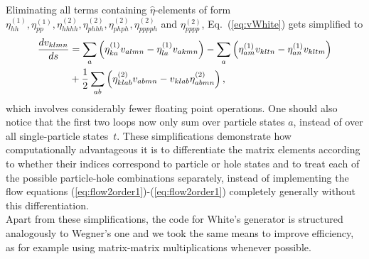 Eliminating all terms containing $\hat{\eta}$-elements of form $\eta_{hh}^{(1)}, \eta_{pp}^{(1)}, \eta_{hhhh}^{(2)}, \eta_{phhh}^{(2)}, \eta_{phph}^{(2)}, \eta_{pppph}^{(2)}$ and $\eta_{pppp}^{(2)}$, Eq.~(\ref{eq:vWhite}) gets simplified to
\begin{align}
\frac{d v_{klmn}}{ds} &= \sum_a  \lb \eta_{ka}^{(1)}v_{almn}- \eta_{la}^{(1)}v_{akmn} \rb 
 - \sum_a \lb \eta_{am}^{(1)} v_{kltn}- \eta_{an}^{(1)} v_{kltm} \rb \notag \\
& +\frac{1}{2}\sum_{ab} \lb\eta_{klab}^{(2)} v_{abmn} - v_{klab}\eta_{abmn}^{(2)}\rb,
\label{eq:vWhiteSimpl}
\end{align}
which involves considerably fewer floating point operations. One should also notice that the first two loops now only sum over particle states $a$, instead of over all single-particle \mbox {states $t$}. These simplifications demonstrate how computationally advantageous it is to differentiate the matrix elements according to whether their indices correspond to particle or hole states and to treat each of the possible particle-hole combinations separately, instead of implementing the flow equations (\ref{eq:flow2order1})-(\ref{eq:flow2order1}) completely generally without this differentiation.\\
Apart from these simplifications, the code for White's generator is structured analogously to Wegner's one and we took the same means to improve efficiency, as for example using matrix-matrix multiplications whenever possible.
